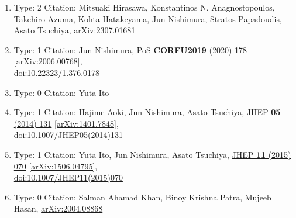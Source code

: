 \documentclass[a4paper,10pt]{article}
\begin{document}
\begin{enumerate}
\begin{enumerate}
  \item Type: 2 Citation: Mitsuaki Hirasawa, Konstantinos N. Anagnostopoulos, Takehiro Azuma, Kohta Hatakeyama, Jun Nishimura, Stratos Papadoudis, Asato Tsuchiya, \href{https://arxiv.org/abs/2307.01681}{arXiv:2307.01681}
  \item Type: 1 Citation: Jun Nishimura, \href{https://www.doi.org/10.22323/1.376.0178}{PoS {\bf CORFU2019} (2020) 178}  \href{https://arxiv.org/abs/2006.00768}{[arXiv:2006.00768]},\\\href{https://www.doi.org/10.22323/1.376.0178}{doi:10.22323/1.376.0178}
  \item Type: 0 Citation: Yuta Ito
  \item Type: 1 Citation: Hajime Aoki, Jun Nishimura, Asato Tsuchiya, \href{https://www.doi.org/10.1007/JHEP05(2014)131}{JHEP {\bf 05} (2014) 131}  \href{https://arxiv.org/abs/1401.7848}{[arXiv:1401.7848]},\\\href{https://www.doi.org/10.1007/JHEP05(2014)131}{doi:10.1007/JHEP05(2014)131}
  \item Type: 1 Citation: Yuta Ito, Jun Nishimura, Asato Tsuchiya, \href{https://www.doi.org/10.1007/JHEP11(2015)070}{JHEP {\bf 11} (2015) 070}  \href{https://arxiv.org/abs/1506.04795}{[arXiv:1506.04795]},\\\href{https://www.doi.org/10.1007/JHEP11(2015)070}{doi:10.1007/JHEP11(2015)070}
  \item Type: 0 Citation: Salman Ahamad Khan, Binoy Krishna Patra, Mujeeb Hasan, \href{https://arxiv.org/abs/2004.08868}{arXiv:2004.08868}

\end{enumerate}
\end{enumerate}
\end{document}
